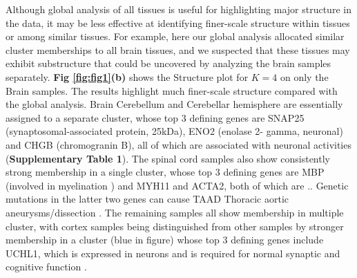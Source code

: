 
Although global analysis of all tissues is useful for highlighting major structure in the data, it may be less effective at identifying finer-scale structure within tissues or among similar tissues. For example, here our global analysis allocated similar cluster memberships to all brain tissues,  and we suspected that these tissues may exhibit substructure that could be uncovered by analyzing the brain samples separately.  \textbf{Fig \ref{fig:fig1}(b)} shows the Structure plot for $K=4$ on only the Brain samples. The results highlight much finer-scale structure compared with the global analysis. Brain Cerebellum and Cerebellar hemisphere are essentially assigned to a separate cluster, whose top 3 defining genes are SNAP25 (synaptosomal-associated protein, 25kDa), ENO2 (enolase 2- gamma, neuronal) and CHGB (chromogranin B),  all of which are associated with neuronal activities (\textbf{Supplementary Table 1}). %
The spinal cord samples also show consistently strong membership in a single cluster, whose top 3 defining genes are MBP  (involved in myelination \cite{Hu2016}) and MYH11 and ACTA2, both of which are .. Genetic mutations in the latter two genes can cause TAAD Thoracic aortic aneurysms/dissection \cite{Renard2013}. The remaining samples all show membership in multiple cluster, with cortex samples being distinguished from other samples by stronger membership in a cluster (blue in figure) whose top 3 defining genes include UCHL1, which is expressed in neurons and is required for normal synaptic and cognitive function \cite{Gong2006}.


